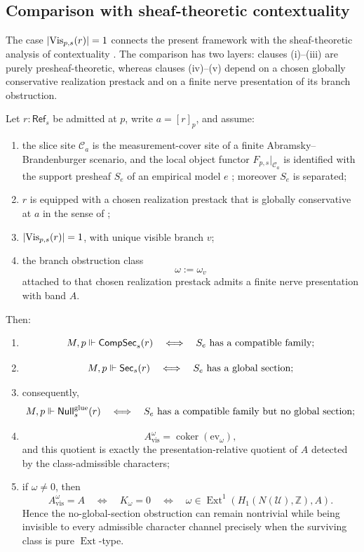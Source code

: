 \subsection{Comparison with sheaf-theoretic contextuality}

The case $|\mathrm{Vis}_{p,s}(r)|=1$ connects the present framework with the sheaf-theoretic analysis of contextuality \cite{AbramskyBrandenburger2011,AbramskyMansfield2012,AbramskyEtAl2015}. The comparison has two layers: clauses \textup{(i)}--\textup{(iii)} are purely presheaf-theoretic, whereas clauses \textup{(iv)}--\textup{(v)} depend on a chosen globally conservative realization prestack and on a finite nerve presentation of its branch obstruction.

\begin{proposition}\label{thm:unique-branch-contextuality-comparison}
Let $r:\mathsf{Ref}_s$ be admitted at $p$, write $a=[r]_p$, and assume:
\begin{enumerate}[label=(\roman*),nosep]
\item the slice site $\mathcal C_a$ is the measurement-cover site of a finite Abramsky--Brandenburger scenario, and the local object functor $F_{p,s}|_{\mathcal C_a}$ is identified with the support presheaf $S_e$ of an empirical model $e$ \cite{AbramskyBrandenburger2011}; moreover $S_e$ is separated;
\item $r$ is equipped with a chosen realization prestack that is globally conservative at $a$ in the sense of ;
\item $|\mathrm{Vis}_{p,s}(r)|=1$, with unique visible branch $v$;
\item the branch obstruction class
\[
\omega:=\omega_v
\]
attached to that chosen realization prestack admits a finite nerve presentation with band $A$.
\end{enumerate}
Then:
\begin{enumerate}[label=(\roman*),nosep]
\item
\[
M,p\Vdash \mathsf{CompSec}_s(r)
\quad\Longleftrightarrow\quad
S_e\ \text{has a compatible family};
\]
\item
\[
M,p\Vdash \mathsf{Sec}_s(r)
\quad\Longleftrightarrow\quad
S_e\ \text{has a global section};
\]
\item consequently,
\[
M,p\Vdash \mathsf{Null}^{\mathrm{glue}}_s(r)
\quad\Longleftrightarrow\quad
S_e\ \text{has a compatible family but no global section};
\]
\item
\[
A_{\mathrm{vis}}^{\omega}
=
\operatorname{coker}(\mathrm{ev}_{\omega}),
\]
and this quotient is exactly the presentation-relative quotient of $A$ detected by the class-admissible characters;
\item if $\omega\neq 0$, then
\[
A_{\mathrm{vis}}^{\omega}=A
\quad\Longleftrightarrow\quad
K_{\omega}=0
\quad\Longleftrightarrow\quad
\omega\in \operatorname{Ext}^1(H_1(N(\mathcal U),\mathbb Z),A).
\]
Hence the no-global-section obstruction can remain nontrivial while being invisible to every admissible character channel precisely when the surviving class is pure $\operatorname{Ext}$-type.
\end{enumerate}
\end{proposition}

